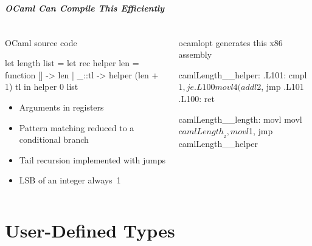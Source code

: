 \documentclass{plt}
\begin{document}
\begin{frame}[fragile]
  \frametitle{OCaml Can Compile This Efficiently}


  \begin{columns}
    \begin{column}[t]{0.5\textwidth}

OCaml source code

\medskip

\begin{ocaml}
let length list =
  let rec helper len = function
      []    -> len
    | _::tl -> helper (len + 1) tl
  in helper 0 list
\end{ocaml}

\begin{itemize}
\item Arguments in registers
\item Pattern matching reduced to a conditional branch
\item Tail recursion implemented with jumps
\item LSB of an integer always~1
\end{itemize}

    \end{column}
    \begin{column}[t]{0.5\textwidth}
ocamlopt generates this x86 assembly

\medskip

\begin{interactive}
\color{black}camlLength__helper:
.L101:
  cmpl  $1, %
  je    .L100
  movl  4(%
  addl  $2, %
  jmp   .L101
.L100:
  ret

camlLength__length:
  movl  %
  movl  $camlLength__2, %
  movl  $1, %
  jmp   camlLength__helper
\end{interactive}    
    \end{column}
  \end{columns}

\end{frame}

\part{User-Defined Types}
\frame{\partpage}
\end{document}
